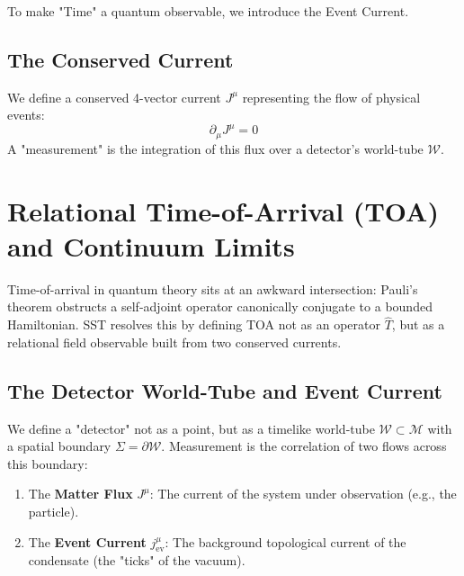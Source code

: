 \documentclass[10pt]{article}
\begin{document}
    To make "Time" a quantum observable, we introduce the Event Current.

    \subsection{The Conserved Current}
        We define a conserved 4-vector current $J^\mu$ representing the flow of physical events:
        \begin{equation}
            \partial_\mu J^\mu = 0
        \end{equation}
        A "measurement" is the integration of this flux over a detector's world-tube $\mathcal{W}$.

    \section{Relational Time-of-Arrival (TOA) and Continuum Limits}
    \label{sec:toa_formalism}

    Time-of-arrival in quantum theory sits at an awkward intersection: Pauli's theorem
    obstructs a self-adjoint operator canonically conjugate to a bounded Hamiltonian.
    SST resolves this by defining TOA not as an operator $\hat{T}$, but as a
    relational field observable built from two conserved currents.

    \subsection{The Detector World-Tube and Event Current}
        We define a "detector" not as a point, but as a timelike world-tube
        $\mathcal{W} \subset \mathcal{M}$ with a spatial boundary $\Sigma = \partial \mathcal{W}$.
        Measurement is the correlation of two flows across this boundary:
        \begin{enumerate}
            \item The \textbf{Matter Flux} $J^\mu$: The current of the system under observation (e.g., the particle).
            \item The \textbf{Event Current} $j_{\mathrm{ev}}^\mu$: The background topological current of the condensate (the "ticks" of the vacuum).
        \end{enumerate}
\end{document}

